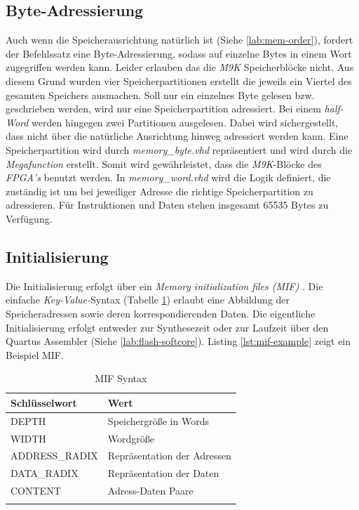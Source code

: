             
        \subsection{Byte-Adressierung}
            Auch wenn die Speicherausrichtung natürlich ist (Siehe \ref{lab:mem-order}), fordert der Befehlssatz eine Byte-Adressierung,
            sodass auf einzelne Bytes in einem Wort zugegriffen werden kann. Leider erlauben das die \textit{M9K} Speicherblöcke nicht.
            Aus diesem Grund wurden vier Speicherpartitionen erstellt die jeweils ein Viertel des gesamten Speichers ausmachen.
            Soll nur ein einzelnes Byte gelesen bzw. geschrieben werden, wird nur eine Speicherpartition adressiert.
            Bei einem \textit{half-Word} werden hingegen zwei Partitionen ausgelesen. Dabei wird sichergestellt,
            dass nicht über die natürliche Ausrichtung hinweg adressiert werden kann.
            Eine Speicherpartition wird durch \textit{memory\_byte.vhd} repräsentiert und wird durch die \textit{Megafunction} erstellt.
            Somit wird gewährleistet, dass die \textit{M9K}-Blöcke des \textit{FPGA's} benutzt werden.
            In \textit{memory\_word.vhd} wird die Logik definiert, die zuständig ist um bei jeweiliger Adresse die 
            richtige Speicherpartition zu adressieren.
            Für Instruktionen und Daten stehen insgesamt 65535 Bytes zu Verfügung.

        \subsection{Initialisierung}\label{lab:mif}
            Die Initialisierung erfolgt über ein \textit{Memory initialization files (MIF)} \cite{intel-mif}.
            Die einfache \textit{Key-Value-}Syntax (Tabelle \ref{tab:mif-syntax}) erlaubt eine Abbildung der Speicheradressen sowie deren korrespondierenden Daten.
            Die eigentliche Initialisierung erfolgt entweder zur Synthesezeit oder zur Laufzeit über den Quartus Assembler (Siehe \ref{lab:flash-softcore}).
            Listing \ref{lst:mif-example} zeigt ein Beispiel MIF.
            \begin{center}
                \begin{longtable}{| l | l |}
                    \hline
                        Schlüsselwort & Wert\\
                    \hline
                        DEPTH & Speichergröße in Words\\
                    \hline
                        WIDTH & Wordgröße\\
                    \hline
                        ADDRESS\_RADIX & Repräsentation der Adressen\\
                    \hline
                        DATA\_RADIX & Repräsentation der Daten\\
                    \hline
                        CONTENT & Adress-Daten Paare\\
                    \hline
                    \caption[MIF Syntax]{MIF Syntax}
                    \label{tab:mif-syntax}
                \end{longtable}
            \end{center}

